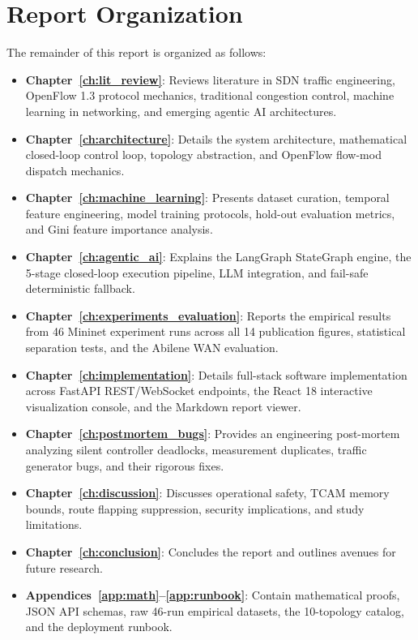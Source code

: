 \section{Report Organization}
The remainder of this report is organized as follows:
\begin{itemize}
  \item \textbf{Chapter~\ref{ch:lit_review}}: Reviews literature in SDN traffic engineering, OpenFlow 1.3 protocol mechanics, traditional congestion control, machine learning in networking, and emerging agentic AI architectures.
  \item \textbf{Chapter~\ref{ch:architecture}}: Details the system architecture, mathematical closed-loop control loop, topology abstraction, and OpenFlow flow-mod dispatch mechanics.
  \item \textbf{Chapter~\ref{ch:machine_learning}}: Presents dataset curation, temporal feature engineering, model training protocols, hold-out evaluation metrics, and Gini feature importance analysis.
  \item \textbf{Chapter~\ref{ch:agentic_ai}}: Explains the LangGraph StateGraph engine, the 5-stage closed-loop execution pipeline, LLM integration, and fail-safe deterministic fallback.
  \item \textbf{Chapter~\ref{ch:experiments_evaluation}}: Reports the empirical results from 46 Mininet experiment runs across all 14 publication figures, statistical separation tests, and the Abilene WAN evaluation.
  \item \textbf{Chapter~\ref{ch:implementation}}: Details full-stack software implementation across FastAPI REST/WebSocket endpoints, the React 18 interactive visualization console, and the Markdown report viewer.
  \item \textbf{Chapter~\ref{ch:postmortem_bugs}}: Provides an engineering post-mortem analyzing silent controller deadlocks, measurement duplicates, traffic generator bugs, and their rigorous fixes.
  \item \textbf{Chapter~\ref{ch:discussion}}: Discusses operational safety, TCAM memory bounds, route flapping suppression, security implications, and study limitations.
  \item \textbf{Chapter~\ref{ch:conclusion}}: Concludes the report and outlines avenues for future research.
  \item \textbf{Appendices~\ref{app:math}--\ref{app:runbook}}: Contain mathematical proofs, JSON API schemas, raw 46-run empirical datasets, the 10-topology catalog, and the deployment runbook.
\end{itemize}
